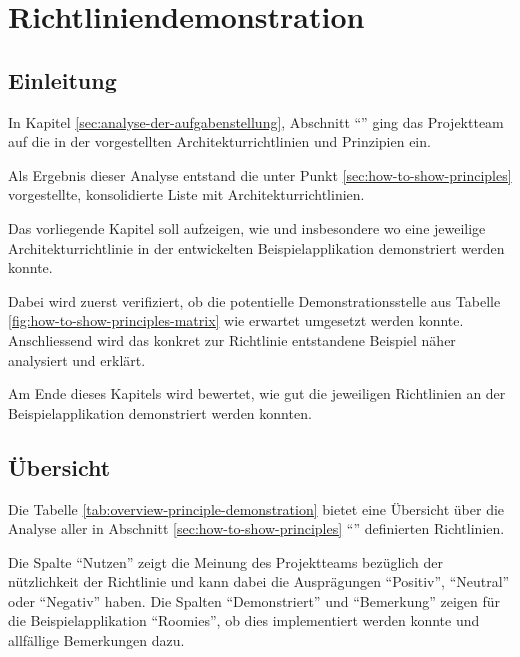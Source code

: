 \chapter{Richtliniendemonstration}
\label{sec:principle-demonstration}

\section*{Einleitung}

In Kapitel \ref{sec:analyse-der-aufgabenstellung}, Abschnitt ``'' ging das Projektteam auf die in der  vorgestellten Architekturrichtlinien und Prinzipien ein.

Als Ergebnis dieser Analyse entstand die unter Punkt \ref{sec:how-to-show-principles} vorgestellte, konsolidierte Liste mit Architekturrichtlinien.

Das vorliegende Kapitel soll aufzeigen, wie und insbesondere wo eine jeweilige Architekturrichtlinie in der entwickelten Beispielapplikation demonstriert werden konnte.

Dabei wird zuerst verifiziert, ob die potentielle Demonstrationsstelle aus Tabelle \ref{fig:how-to-show-principles-matrix} wie erwartet umgesetzt werden konnte.
Anschliessend wird das konkret zur Richtlinie entstandene Beispiel näher analysiert und erklärt.

Am Ende dieses Kapitels wird bewertet, wie gut die jeweiligen Richtlinien an der Beispielapplikation demonstriert werden konnten.

\newpage
\section{Übersicht}

Die Tabelle \ref{tab:overview-principle-demonstration} bietet eine Übersicht über die Analyse aller in Abschnitt \ref{sec:how-to-show-principles} ``'' definierten Richtlinien.


Die Spalte ``Nutzen'' zeigt die Meinung des Projektteams bezüglich der nützlichkeit der Richtlinie und kann dabei die Ausprägungen ``Positiv'', ``Neutral'' oder ``Negativ'' haben.
Die Spalten ``Demonstriert'' und ``Bemerkung'' zeigen für die Beispielapplikation ``Roomies'', ob dies implementiert werden konnte und allfällige Bemerkungen dazu.

